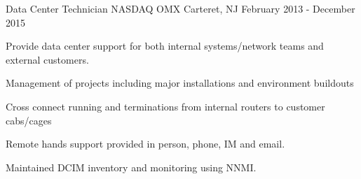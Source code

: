 \begin{cventries}

	\cventry
	{Data Center Technician}
	{NASDAQ OMX}
	{Carteret, NJ}
	{February 2013 - December 2015}
	{
		\begin{cvitems}
		\item {Provide data center support for both internal systems/network teams and external customers.}
		\item {Management of projects including major installations and environment buildouts}
		\item {Cross connect running and terminations from internal routers to customer cabs/cages}
		\item {Remote hands support provided in person, phone, IM and email.}
		\item {Maintained DCIM inventory and monitoring using NNMI.}
		\end{cvitems}
	}

\end{cventries}
